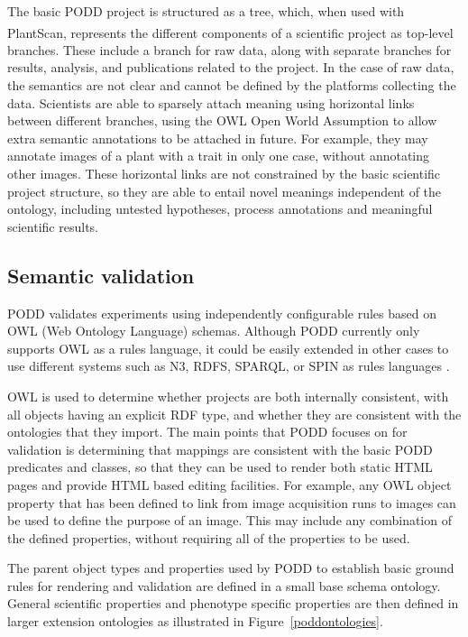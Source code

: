 \documentclass{llncs}
\begin{document}
The basic PODD project is structured as a tree, which, when used with
PlantScan\textsuperscript{\texttrademark}, represents the different components
of a scientific project as
top-level branches. These include a branch for raw data, along with separate
branches for results, analysis, and publications related to the project. In the
case of raw data, the semantics are not clear and cannot be defined by the
platforms collecting the data. Scientists are able to sparsely attach meaning
using horizontal links between different branches, using the OWL Open World
Assumption to allow extra semantic annotations to be attached in future. For
example, they may annotate images of a plant with a trait in only one case,
without annotating other images. These horizontal links are not constrained by
the basic scientific project structure, so they are able to entail novel
meanings independent of the ontology, including untested hypotheses, process
annotations and meaningful scientific results.


\subsection{Semantic validation}
PODD validates experiments using independently configurable rules based on OWL
(Web Ontology Language) schemas. Although PODD currently only supports OWL as a
rules language, it could be easily extended in other cases to use different
systems such as N3, RDFS, SPARQL, or SPIN as rules languages \cite{Fuerber2010}. 


OWL is used to determine whether projects are both internally consistent, with
all objects having an explicit RDF type, and whether they are consistent with
the ontologies that they import. The main points that PODD focuses on for
validation is determining that mappings are consistent with the basic PODD
predicates and classes, so that they can be used to render both static HTML
pages and provide HTML based editing facilities. For example, any OWL object
property that has been defined to link from image acquisition runs to images can
be used to define the purpose of an image. This may include any combination of
the defined properties, without requiring all of the properties to be used.


The parent object types and properties used by PODD to establish basic ground
rules for rendering and validation are defined in a small base schema ontology.
General scientific properties and phenotype specific properties are then defined
in larger extension ontologies as illustrated in Figure~\ref{poddontologies}.
\end{document}
